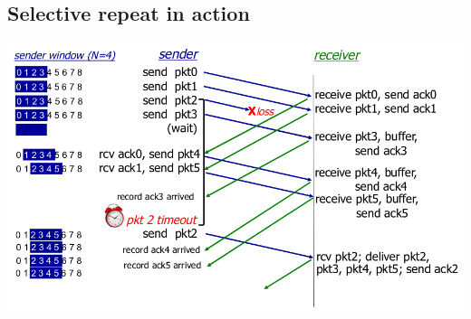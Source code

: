 \documentclass{article}[18pt]
\begin{document}
\subsection{Selective repeat in action}
\begin{center}
	\includegraphics[scale=0.7]{selective_repeat_action}
\end{center}
\end{document}
